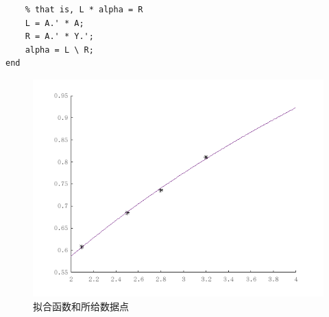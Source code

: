 \documentclass[12pt,a4paper,utf8]{ctexart}
\begin{document}
\begin{enumerate}
\begin{itemize}
\begin{lstlisting}[frame=single]
    % A^T * A * alpha = A^T * Y^T
    % that is, L * alpha = R
    L = A.' * A;
    R = A.' * Y.';
    alpha = L \ R;
end
  \end{lstlisting}

  \begin{figure}[htbp]
    \centering
    \includegraphics[scale=0.7]{pictures/p4.png}
    \caption{\small{拟合函数和所给数据点}} %
  \end{figure}
  \end{itemize}
\end{enumerate}
\end{document}
